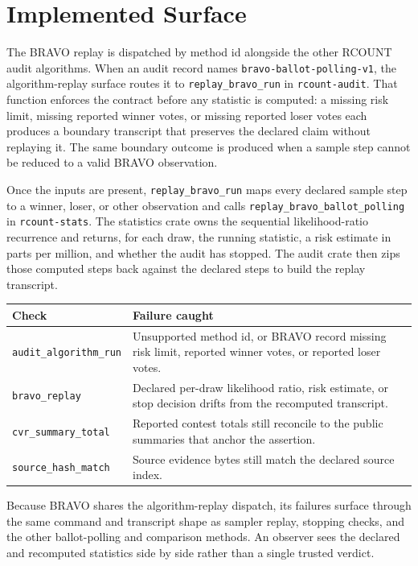 \section{Implemented Surface}

The BRAVO replay is dispatched by method id alongside the other RCOUNT audit
algorithms. When an audit record names \texttt{bravo-ballot-polling-v1}, the
algorithm-replay surface routes it to \texttt{replay\_bravo\_run} in
\texttt{rcount-audit}. That function enforces the contract before any statistic
is computed: a missing risk limit, missing reported winner votes, or missing
reported loser votes each produces a boundary transcript that preserves the
declared claim without replaying it. The same boundary outcome is produced when
a sample step cannot be reduced to a valid BRAVO observation.

Once the inputs are present, \texttt{replay\_bravo\_run} maps every declared
sample step to a winner, loser, or other observation and calls
\texttt{replay\_bravo\_ballot\_polling} in \texttt{rcount-stats}. The statistics
crate owns the sequential likelihood-ratio recurrence and returns, for each
draw, the running statistic, a risk estimate in parts per million, and whether
the audit has stopped. The audit crate then zips those computed steps back
against the declared steps to build the replay transcript.

\begin{center}
\small
\begin{tabularx}{\textwidth}{lX}
\toprule
Check & Failure caught \\
\midrule
\texttt{audit\_algorithm\_run} & Unsupported method id, or BRAVO record missing risk limit, reported winner votes, or reported loser votes. \\
\texttt{bravo\_replay} & Declared per-draw likelihood ratio, risk estimate, or stop decision drifts from the recomputed transcript. \\
\texttt{cvr\_summary\_total} & Reported contest totals still reconcile to the public summaries that anchor the assertion. \\
\texttt{source\_hash\_match} & Source evidence bytes still match the declared source index. \\
\bottomrule
\end{tabularx}
\end{center}

Because BRAVO shares the algorithm-replay dispatch, its failures surface through
the same command and transcript shape as sampler replay, stopping checks, and
the other ballot-polling and comparison methods. An observer sees the declared
and recomputed statistics side by side rather than a single trusted verdict.
